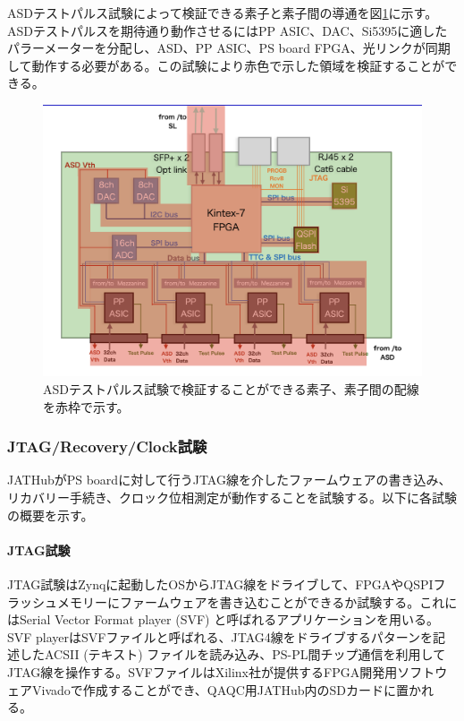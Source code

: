 ASDテストパルス試験によって検証できる素子と素子間の導通を図\ref{QAQCasdtpelements}に示す。ASDテストパルスを期待通り動作させるにはPP ASIC、DAC、Si5395に適したパラーメーターを分配し、ASD、PP ASIC、PS board FPGA、光リンクが同期して動作する必要がある。この試験により赤色で示した領域を検証することができる。
\baselineskip

\begin{figure} 
\centering
\includegraphics[width=16cm]{fig/QAQC/QAQCasdtpelements.png}
\caption[ASDテストパルス試験で検証できる素子]{ASDテストパルス試験で検証することができる素子、素子間の配線を赤枠で示す。}
\label{QAQCasdtpelements}
\end{figure}

\subsubsection{JTAG/Recovery/Clock試験}
\baselineskip

\label{subsubsec_jtag}
JATHubがPS boardに対して行うJTAG線を介したファームウェアの書き込み、リカバリー手続き、クロック位相測定が動作することを試験する。以下に各試験の概要を示す。

\paragraph{JTAG試験}\par
JTAG試験はZynqに起動したOSからJTAG線をドライブして、FPGAやQSPIフラッシュメモリーにファームウェアを書き込むことができるか試験する。これにはSerial Vector Format player (SVF) と呼ばれるアプリケーションを用いる。
SVF playerはSVFファイルと呼ばれる、JTAG4線をドライブするパターンを記述したACSII (テキスト) ファイルを読み込み、PS-PL間チップ通信を利用してJTAG線を操作する。SVFファイルはXilinx社が提供するFPGA開発用ソフトウェアVivadoで作成することができ、QAQC用JATHub内のSDカードに置かれる。
\baselineskip

